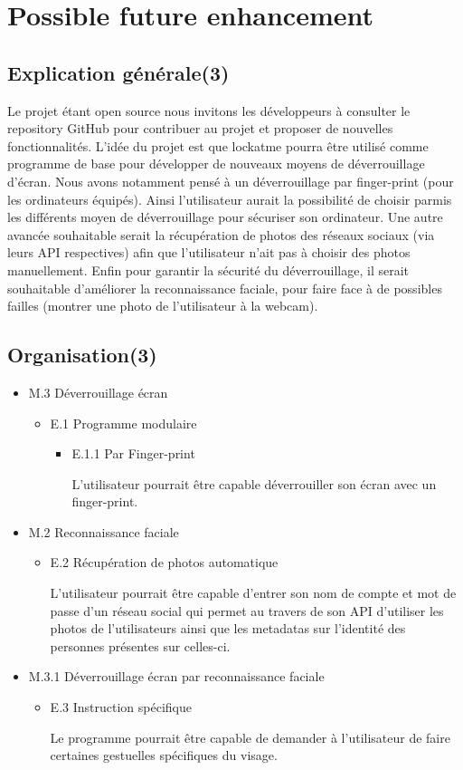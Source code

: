 \section{Possible future enhancement}
  \subsection{Explication générale(3)}
  Le projet étant open source nous invitons les développeurs à consulter le
  repository GitHub pour contribuer au projet et proposer de nouvelles
  fonctionnalités.
  L’idée du projet est que lockatme pourra être utilisé comme programme de
  base pour développer de nouveaux moyens de déverrouillage d’écran. Nous
  avons notamment pensé à un déverrouillage par finger-print (pour les
  ordinateurs équipés). Ainsi l’utilisateur aurait la possibilité de choisir
  parmis les différents moyen de déverrouillage pour sécuriser son ordinateur.
  Une autre avancée souhaitable serait la récupération de photos des réseaux
  sociaux (via leurs API respectives) afin que l’utilisateur n’ait pas à
  choisir des photos manuellement.
  Enfin pour garantir la sécurité du déverrouillage, il serait souhaitable
  d’améliorer la reconnaissance faciale, pour faire face à de possibles
  failles (montrer une photo de l’utilisateur à la webcam).
  \subsection{Organisation(3)}
  \begin{itemize}
  \item{M.3 Déverrouillage écran}
    \begin{itemize}
    \item{E.1 Programme modulaire}
      \begin{itemize}
      \item{E.1.1 Par Finger-print}

      L’utilisateur pourrait être capable déverrouiller son écran avec un
      finger-print.
      \\
      \end{itemize}
    \end{itemize}
    \item{M.2 Reconnaissance faciale}
    \begin{itemize}
    \item{E.2 Récupération de photos automatique}

    L’utilisateur pourrait être capable d’entrer son nom de compte et mot de
    passe d’un réseau social qui permet au travers de son API d’utiliser les
    photos de l’utilisateurs ainsi que les metadatas sur l’identité des
    personnes présentes sur celles-ci.
    \\
    \end{itemize}
    \item{M.3.1 Déverrouillage écran par reconnaissance faciale}
    \begin{itemize}
      \item{E.3 Instruction spécifique}

      Le programme pourrait être capable de demander à l’utilisateur de faire
      certaines gestuelles spécifiques du visage.
    \end{itemize}
  \end{itemize}

